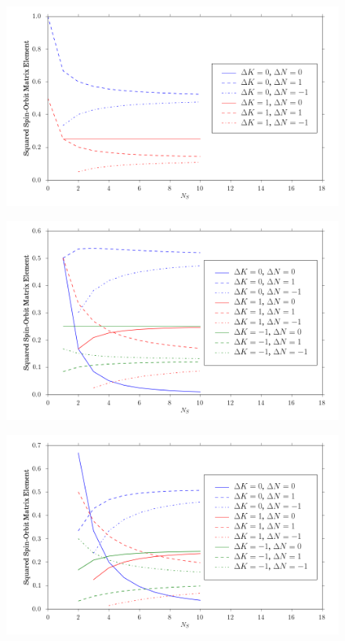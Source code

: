 \documentclass[12pt]{mitthesis}
\begin{document}
\begin{figure}
  \caption{}
  \label{fig:rotational-factors-0}
  \centering
  \includegraphics[width=6in]{rotational_factors_k0.png}
\end{figure}

\begin{figure}
  \caption{}
  \label{fig:rotational-factors-1}
  \centering
  \includegraphics[width=6in]{rotational_factors_k1.png}
\end{figure}

\begin{figure}
  \caption{}
  \label{fig:rotational-factors-2}
  \centering
  \includegraphics[width=6in]{rotational_factors_k2.png}
\end{figure}
\end{document}
